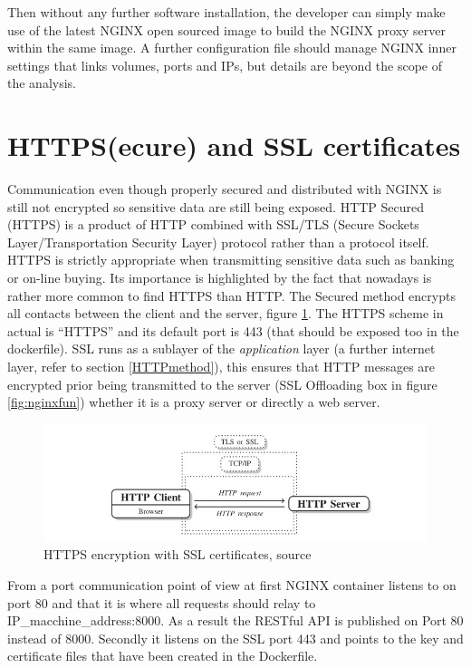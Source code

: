 \documentclass[
  12pt,
  a4paper,
  oneside]{book}
\theoremstyle{definition}
\theoremstyle{definition}
\theoremstyle{definition}
\theoremstyle{remark}
\begin{document}
Then without any further software installation, the developer can simply make use of the latest NGINX open sourced image to build the NGINX proxy server within the same image. A further configuration file should manage NGINX inner settings that links volumes, ports and IPs, but details are beyond the scope of the analysis.

\hypertarget{HTTPS}{%
\section{HTTPS(ecure) and SSL certificates}\label{HTTPS}}

Communication even though properly secured and distributed with NGINX is still not encrypted so sensitive data are still being exposed. HTTP Secured (HTTPS) is a product of HTTP combined with SSL/TLS (Secure Sockets Layer/Transportation Security Layer) protocol rather than a protocol itself. HTTPS is strictly appropriate when transmitting sensitive data such as banking or on-line buying. Its importance is highlighted by the fact that nowadays is rather more common to find HTTPS than HTTP. The Secured method encrypts all contacts between the client and the server, figure \ref{fig:httpsmeth}. The HTTPS scheme in actual is ``HTTPS'' and its default port is 443 (that should be exposed too in the dockerfile). SSL runs as a sublayer of the \emph{application} layer (a further internet layer, refer to section \ref{HTTPmethod}), this ensures that HTTP messages are encrypted prior being transmitted to the server (SSL Offloading box in figure \ref{fig:nginxfun}) whether it is a proxy server or directly a web server.

\begin{figure}
\centering
\includegraphics{images/https_method.jpg}
\caption{\label{fig:httpsmeth}HTTPS encryption with SSL certificates, source \citet{automateddatacollection}}
\end{figure}

From a port communication point of view at first NGINX container listens to on port 80 and that it is where all requests should relay to IP\_macchine\_address:8000. As a result the RESTful API is published on Port 80 instead of 8000. Secondly it listens on the SSL port 443 and points to the key and certificate files that have been created in the Dockerfile.
\end{document}

